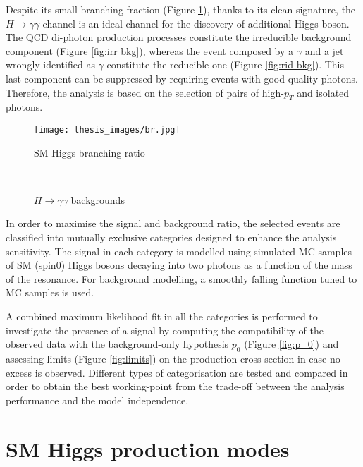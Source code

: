 \documentclass[a4paper, oneside, 11pt, openright]{book}
\begin{document}
 	 	Despite its small branching fraction (Figure \ref{fig: br}), thanks to its clean signature, the $H\to\gamma\gamma$ channel is an ideal channel for the discovery of additional Higgs boson. The QCD di-photon production processes constitute the irreducible background component (Figure \ref{fig:irr bkg}), whereas the event composed by a $\gamma$ and a jet wrongly identified as $\gamma$ constitute the reducible one (Figure \ref{fig:rid bkg}). This last component can be suppressed by requiring events with good-quality photons. Therefore, the analysis is based on the selection of pairs of high-$p_T$ and isolated photons.
 		\begin{figure}
 			\centering
 			\texttt{[image: thesis\_images/br.jpg]}
 			\caption{SM Higgs branching ratio}
 			\label{fig: br}
 		\end{figure}
	 	\begin{figure}
	 		\centering
	 		\\				
	 		\caption{$H\rightarrow\gamma\gamma$ backgrounds}
	 		\label{fig:bkgs}
	 	\end{figure}In order to maximise the signal and background ratio, the selected events are classified into mutually exclusive categories designed to enhance the analysis sensitivity. The signal in each category is modelled using simulated MC samples of SM (spin0) Higgs bosons decaying into two photons as a function of the mass of the resonance. For background modelling, a smoothly falling function tuned to MC samples is used.
 		
 		A combined maximum likelihood fit in all the categories is performed to investigate the presence of a signal by computing the compatibility of the observed data with the background-only hypothesis $p_0$ (Figure \ref{fig:p_0}) and assessing limits (Figure \ref{fig:limits}) on the production cross-section in case no excess is observed. Different types of categorisation are tested and compared in order to obtain the best working-point from the trade-off between the analysis performance and the model independence.
 		
 		\section{SM Higgs production modes}
 	
\end{document}
